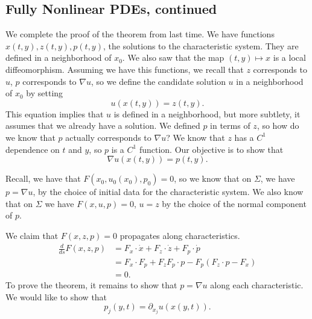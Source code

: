\documentclass[11pt]{scrartcl}
\begin{document}
\subsection{Fully Nonlinear PDEs, continued}
We complete the proof of the theorem from last time. 
We have functions $x(t, y), z(t, y), p(t, y)$, the solutions to the characteristic system.   They are defined in a neighborhood of $x_0$.    We also saw that the map $(t, y) \mapsto x$ is a local diffeomorphism.  Assuming we have this functions, we recall that $z$ corresponds to $u$, $p$ corresponds to $\nabla u$, so we define the candidate solution $u$ in a neighborhood of $x_0$ by setting
$$u(x(t, y)) = z(t, y).$$
This equation implies that $u$ is defined in a neighborhood, but more subtlety, it assumes that we already have a solution.  We defined $p$ in terms of $z$, so how do we know that $p$ actually corresponds to $\nabla u$?  We know that $z$ has a $C^1$ dependence on $t$ and $y$, so $p$ is a $C^1$ function.   Our objective is to show that 
$$\nabla u(x(t, y)) = p(t, y).$$

Recall, we have that $F(x_0, u_0(x_0), p_0) = 0$, so we know that on $\Sigma$, we have $p = \nabla u$, by the choice of initial data for the characteristic system.  We also know that on $\Sigma$ we have $F(x, u, p) = 0$, $u = z$ by the choice of the normal component of $p$.  

We claim that $F(x, z, p) = 0$ propagates along characteristics.  
\begin{align*}
\frac{d}{ds} F(x, z, p) &= F_x\cdot \dot x  + F_z \cdot \dot z + F_p \cdot \dot p \\
&= F_x \cdot F_p + F_z F_p \cdot p - F_p(F_z \cdot p - F_x)\\
&= 0.
\end{align*}
To prove the theorem, it remains to show that $p = \nabla u$ along each characteristic.  We would like to show that $$p_j(y, t) = \partial_{x_j}u(x(y, t)).$$
\end{document}
